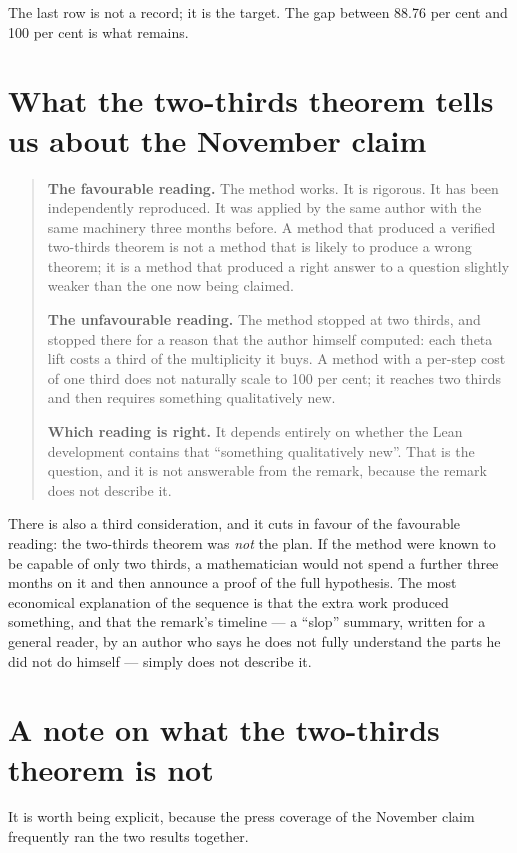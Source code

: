The last row is not a record; it is the target. The gap between 88.76 per cent
and 100 per cent is what remains.

\section{What the two-thirds theorem tells us about the November claim}\begin{quote}
\textbf{The favourable reading.} The method works. It is rigorous. It has
been independently reproduced. It was applied by the same author with the same
machinery three months before. A method that produced a verified two-thirds
theorem is not a method that is likely to produce a wrong theorem; it is a
method that produced a right answer to a question slightly weaker than the one
now being claimed.

\textbf{The unfavourable reading.} The method stopped at two thirds, and
stopped there for a reason that the author himself computed: each theta lift
costs a third of the multiplicity it buys. A method with a per-step cost of
one third does not naturally scale to 100 per cent; it reaches two thirds and
then requires something qualitatively new.

\textbf{Which reading is right.} It depends entirely on whether the Lean
development contains that ``something qualitatively new''. That is the
question, and it is not answerable from the remark, because the remark does not
describe it.
\end{quote}

There is also a third consideration, and it cuts in favour of the favourable
reading: the two-thirds theorem was \emph{not} the plan. If the method were
known to be capable of only two thirds, a mathematician would not spend a
further three months on it and then announce a proof of the full hypothesis.
The most economical explanation of the sequence is that the extra work
produced something, and that the remark's timeline --- a ``slop'' summary,
written for a general reader, by an author who says he does not fully
understand the parts he did not do himself --- simply does not describe it.

\section{A note on what the two-thirds theorem is not}It is worth being explicit, because the press coverage of the November claim
frequently ran the two results together.

